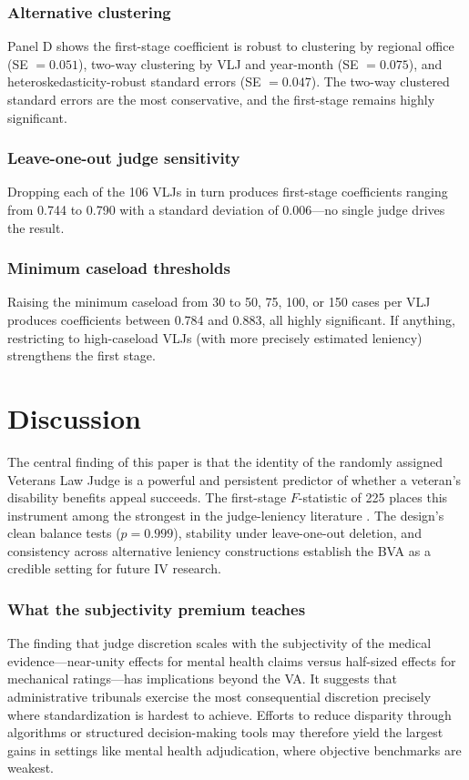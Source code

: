 \documentclass[12pt]{article}
\begin{document}
\subsubsection*{Alternative clustering} Panel D shows the first-stage coefficient is robust to clustering by regional office (SE $= 0.051$), two-way clustering by VLJ and year-month (SE $= 0.075$), and heteroskedasticity-robust standard errors (SE $= 0.047$). The two-way clustered standard errors are the most conservative, and the first-stage remains highly significant.

\subsubsection*{Leave-one-out judge sensitivity} Dropping each of the 106 VLJs in turn produces first-stage coefficients ranging from 0.744 to 0.790 with a standard deviation of 0.006---no single judge drives the result.

\subsubsection*{Minimum caseload thresholds} Raising the minimum caseload from 30 to 50, 75, 100, or 150 cases per VLJ produces coefficients between 0.784 and 0.883, all highly significant. If anything, restricting to high-caseload VLJs (with more precisely estimated leniency) strengthens the first stage.


\section{Discussion}

The central finding of this paper is that the identity of the randomly assigned Veterans Law Judge is a powerful and persistent predictor of whether a veteran's disability benefits appeal succeeds. The first-stage $F$-statistic of 225 places this instrument among the strongest in the judge-leniency literature \citep{chyn2024}. The design's clean balance tests ($p = 0.999$), stability under leave-one-out deletion, and consistency across alternative leniency constructions establish the BVA as a credible setting for future IV research.

\subsubsection*{What the subjectivity premium teaches} The finding that judge discretion scales with the subjectivity of the medical evidence---near-unity effects for mental health claims versus half-sized effects for mechanical ratings---has implications beyond the VA. It suggests that administrative tribunals exercise the most consequential discretion precisely where standardization is hardest to achieve. Efforts to reduce disparity through algorithms or structured decision-making tools \citep{kleinberg2018} may therefore yield the largest gains in settings like mental health adjudication, where objective benchmarks are weakest.
\end{document}
